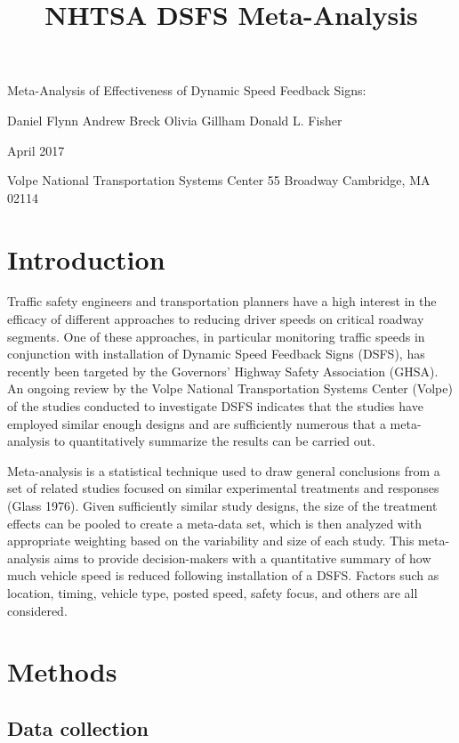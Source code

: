 \documentclass[]{article}
\title{NHTSA DSFS Meta-Analysis}
\author{}
\date{}
\begin{document}
\maketitle

\centering
Meta-Analysis of Effectiveness of Dynamic Speed Feedback Signs:

Daniel Flynn Andrew Breck Olivia Gillham Donald L. Fisher

April 2017

Volpe National Transportation Systems Center 55 Broadway Cambridge, MA
02114

\clearpage
\tableofcontents
\clearpage
\raggedright

\section{Introduction}\label{introduction}

Traffic safety engineers and transportation planners have a high
interest in the efficacy of different approaches to reducing driver
speeds on critical roadway segments. One of these approaches, in
particular monitoring traffic speeds in conjunction with installation of
Dynamic Speed Feedback Signs (DSFS), has recently been targeted by the
Governors' Highway Safety Association (GHSA). An ongoing review by the
Volpe National Transportation Systems Center (Volpe) of the studies
conducted to investigate DSFS indicates that the studies have employed
similar enough designs and are sufficiently numerous that a
meta-analysis to quantitatively summarize the results can be carried
out.

Meta-analysis is a statistical technique used to draw general
conclusions from a set of related studies focused on similar
experimental treatments and responses (Glass 1976). Given sufficiently
similar study designs, the size of the treatment effects can be pooled
to create a meta-data set, which is then analyzed with appropriate
weighting based on the variability and size of each study. This
meta-analysis aims to provide decision-makers with a quantitative
summary of how much vehicle speed is reduced following installation of a
DSFS. Factors such as location, timing, vehicle type, posted speed,
safety focus, and others are all considered.

\section{Methods}\label{methods}

\subsection{Data collection}\label{data-collection}
\end{document}
